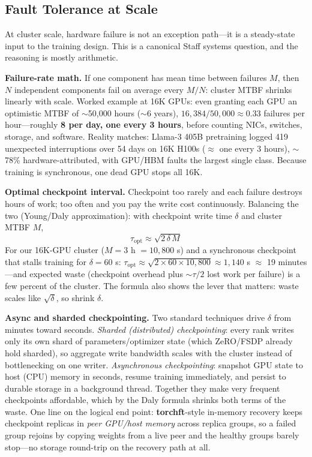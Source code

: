 \subsection{Fault Tolerance at Scale}
\label{subsec:fault_tolerance}

At cluster scale, hardware failure is not an exception path---it is a steady-state input to the training design. This is a canonical Staff systems question, and the reasoning is mostly arithmetic.

\textbf{Failure-rate math.} If one component has mean time between failures $M$, then $N$ independent components fail on average every $M/N$: cluster MTBF shrinks linearly with scale. Worked example at 16K GPUs: even granting each GPU an optimistic MTBF of $\sim$50,000 hours ($\sim$6 years), $16{,}384/50{,}000 \approx 0.33$ failures per hour---roughly \textbf{8 per day, one every 3 hours}, before counting NICs, switches, storage, and software. Reality matches: Llama-3 405B pretraining logged 419 unexpected interruptions over 54 days on 16K H100s ($\approx$ one every 3 hours), $\sim$78\% hardware-attributed, with GPU/HBM faults the largest single class. Because training is synchronous, one dead GPU stops all 16K.

\textbf{Optimal checkpoint interval.} Checkpoint too rarely and each failure destroys hours of work; too often and you pay the write cost continuously. Balancing the two (Young/Daly approximation): with checkpoint write time $\delta$ and cluster MTBF $M$,
\begin{equation}
\tau_{\text{opt}} \approx \sqrt{2\,\delta\,M}
\end{equation}
For our 16K-GPU cluster ($M = 3$ h $= 10{,}800$ s) and a synchronous checkpoint that stalls training for $\delta = 60$ s: $\tau_{\text{opt}} \approx \sqrt{2 \times 60 \times 10{,}800} \approx 1{,}140$ s $\approx$ 19 minutes---and expected waste (checkpoint overhead plus $\sim\tau/2$ lost work per failure) is a few percent of the cluster. The formula also shows the lever that matters: waste scales like $\sqrt{\delta}$, so shrink $\delta$.

\textbf{Async and sharded checkpointing.} Two standard techniques drive $\delta$ from minutes toward seconds. \emph{Sharded (distributed) checkpointing}: every rank writes only its own shard of parameters/optimizer state (which ZeRO/FSDP already hold sharded), so aggregate write bandwidth scales with the cluster instead of bottlenecking on one writer. \emph{Asynchronous checkpointing}: snapshot GPU state to host (CPU) memory in seconds, resume training immediately, and persist to durable storage in a background thread. Together they make very frequent checkpoints affordable, which by the Daly formula shrinks both terms of the waste. One line on the logical end point: \textbf{torchft}-style in-memory recovery keeps checkpoint replicas in \emph{peer GPU/host memory} across replica groups, so a failed group rejoins by copying weights from a live peer and the healthy groups barely stop---no storage round-trip on the recovery path at all.

